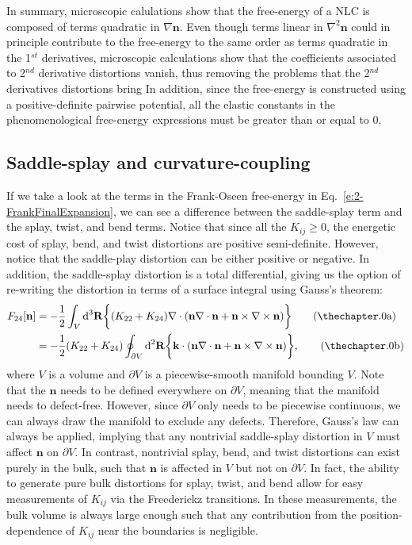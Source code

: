 In summary, microscopic calulations show that the free-energy of a NLC is composed of terms quadratic in $\nabla \mathbf{n}$.
Even though terms linear in $\nabla ^2 \mathbf{n}$ could in principle contribute to the free-energy to the same order as terms quadratic in the 1$^{st}$ derivatives, microscopic calculations show that the coefficients associated to 2$^{nd}$ derivative distortions vanish, thus removing the problems that the 2$^{nd}$ derivatives distortions bring
In addition, since the free-energy is constructed using a positive-definite pairwise potential, all the elastic constants in the phenomenological free-energy expressions must be greater than or equal to 0.


\subsection{Saddle-splay and curvature-coupling}
If we take a look at the terms in the Frank-Oseen free-energy in Eq.~\ref{e:2-FrankFinalExpansion}, we can see a difference between the saddle-splay term and the splay, twist, and bend terms.
Notice that since all the $K_{ij} \geq 0$, the energetic cost of splay, bend, and twist distortions are positive semi-definite.
However, notice that the saddle-play distortion can be either positive or negative.
In addition, the saddle-splay distortion is a total differential, giving us the option of re-writing the distortion in terms of a surface integral using Gauss's theorem:
\label{e:2-F24Gauss}
\begin{align}
  F_{24}[\mathbf{n}] &= - \frac{1}{2}\int_{V} \textup{d}^3  \mathbf{R} \bigg \{ (K_{22} + K_{24})  \nabla \cdot (\mathbf{n}\nabla \cdot \mathbf{n} + \mathbf{n} \times \nabla \times \mathbf{n}) \bigg \}\tag{\theequation a}  \\ &=
  - \frac{1}{2}(K_{22} + K_{24}) \oint_{\partial V} \textup{d}^2  \mathbf{R} \bigg \{   \mathbf{k} \cdot (\mathbf{n}\nabla \cdot \mathbf{n} + \mathbf{n} \times \nabla \times \mathbf{n}) \bigg \},\tag{\theequation b}
\end{align}
where $V$ is a volume and $\partial V$ is a piecewise-smooth manifold bounding $V$.
Note that the $\mathbf{n}$ needs to be defined everywhere on $\partial V$, meaning that the manifold needs to defect-free.
However, since $\partial V$ only needs to be piecewise continuous, we can always draw the manifold to exclude any defects.
Therefore, Gauss's law can always be applied, implying that any nontrivial saddle-splay distortion in $V$ must affect $\mathbf{n}$ on $\partial V$.
In contrast, nontrivial splay, bend, and twist distortions can exist purely in the bulk, such that $\mathbf{n}$ is affected in $V$ but not on $\partial V$.
In fact, the ability to generate pure bulk distortions for splay, twist, and bend allow for easy measurements of $K_{ij}$ via the Freederickz transitions.
In these measurements, the bulk volume is always large enough such that any contribution from the position-dependence of $K_{ij}$ near the boundaries is negligible. \\

